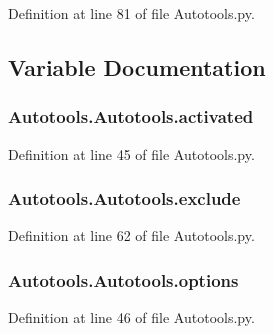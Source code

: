 Definition at line 81 of file Autotools.\-py.



\subsection{Variable Documentation}
\hypertarget{group___tools_ga6bbb714a91bc8b6fe749326772b073b3}{
\subsubsection[{activated}]{\setlength{\rightskip}{0pt plus 5cm}Autotools.\-Autotools.\-activated}}\label{group___tools_ga6bbb714a91bc8b6fe749326772b073b3}


Definition at line 45 of file Autotools.\-py.

\hypertarget{group___tools_gaee37d9789ea22ee310ebc357cd721b7f}{
\subsubsection[{exclude}]{\setlength{\rightskip}{0pt plus 5cm}Autotools.\-Autotools.\-exclude}}\label{group___tools_gaee37d9789ea22ee310ebc357cd721b7f}


Definition at line 62 of file Autotools.\-py.

\hypertarget{group___tools_ga8b348e19f0a7104bde9c43c3a6ed695d}{
\subsubsection[{options}]{\setlength{\rightskip}{0pt plus 5cm}Autotools.\-Autotools.\-options}}\label{group___tools_ga8b348e19f0a7104bde9c43c3a6ed695d}


Definition at line 46 of file Autotools.\-py.

